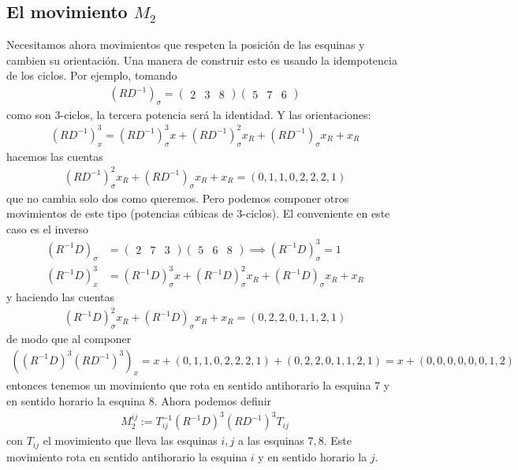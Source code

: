 \documentclass{article}
\theoremstyle{definition}
\begin{document}
\subsection[M2]{El movimiento $M_2$}
Necesitamos ahora movimientos que respeten la posición de las esquinas y cambien su orientación. Una manera de construir esto es usando la idempotencia de los ciclos. Por ejemplo, tomando
\begin{align*}
    (RD^{-1})_\sigma=\begin{pmatrix}
                         2 & 3 & 8
                     \end{pmatrix}
    \begin{pmatrix}
        5 & 7 & 6
    \end{pmatrix}
\end{align*}
como son 3-ciclos, la tercera potencia será la identidad. Y las orientaciones:
\begin{align*}
    (RD^{-1})^3_x=(RD^{-1})^3_\sigma x+(RD^{-1})^2_\sigma x_R+(RD^{-1})_\sigma x_R+x_R
\end{align*}
hacemos las cuentas
\begin{align*}
    (RD^{-1})^2_\sigma x_R+(RD^{-1})_\sigma x_R+x_R=(0,1,1,0,2,2,2,1)
\end{align*}
que no cambia solo dos como queremos. Pero podemos componer otros movimientos de este tipo (potencias cúbicas de 3-ciclos). El conveniente en este caso es el inverso
\begin{align*}
    (R^{-1}D)_\sigma & =\begin{pmatrix}
                            2 & 7 & 3
                        \end{pmatrix}\begin{pmatrix}
                                         5 & 6 & 8
                                     \end{pmatrix}\implies (R^{-1}D)_\sigma^3=1              \\
    (R^{-1}D)_x^{3}  & =(R^{-1}D)^3_\sigma x+(R^{-1}D)^2_\sigma x_R+(R^{-1}D)_\sigma x_R+x_R
\end{align*}
y haciendo las cuentas
\begin{align*}
    (R^{-1}D)^2_\sigma x_R+(R^{-1}D)_\sigma x_R+x_R=(0,2,2,0,1,1,2,1)
\end{align*}
de modo que al componer
\begin{align*}
    \left((R^{-1}D)^3(RD^{-1})^3\right)_x=x+(0,1,1,0,2,2,2,1)+(0,2,2,0,1,1,2,1)=x+(0,0,0,0,0,0,1,2)
\end{align*}
entonces tenemos un movimiento que rota en sentido antihorario la esquina $7$ y en sentido horario la esquina $8$. Ahora podemos definir
\begin{align*}
    M_2^{ij}:=T_{ij}^{-1} (R^{-1}D)^3(RD^{-1})^3T_{ij}
\end{align*}
con $T_{ij}$ el movimiento que lleva las esquinas $i,j$ a las esquinas $7, 8$. Este movimiento rota en sentido antihorario la esquina $i$ y en sentido horario la $j$.
\end{document}
